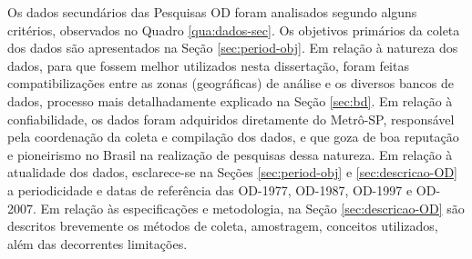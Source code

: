 Os dados secundários das Pesquisas OD foram analisados segundo alguns critérios, observados no Quadro \ref{qua:dados-sec}. Os objetivos primários da coleta dos dados são apresentados na Seção \ref{sec:period-obj}. Em relação à natureza dos dados, para que fossem melhor utilizados nesta dissertação, foram feitas compatibilizações entre as zonas (geográficas) de análise e os diversos bancos de dados, processo mais detalhadamente explicado na Seção \ref{sec:bd}. Em relação à confiabilidade, os dados foram adquiridos diretamente do Metrô-SP, responsável pela coordenação da coleta e compilação dos dados, e que goza de boa reputação e pioneirismo no Brasil na realização de pesquisas dessa natureza. Em relação à atualidade dos dados, esclarece-se na Seções \ref{sec:period-obj} e \ref{sec:descricao-OD} a periodicidade e datas de referência das OD-1977, OD-1987, OD-1997 e OD-2007. Em relação às especificações e metodologia, na Seção \ref{sec:descricao-OD} são descritos brevemente os métodos de coleta, amostragem, conceitos utilizados, além das decorrentes limitações.

\begin{quadro}[htb]
\end{quadro}


